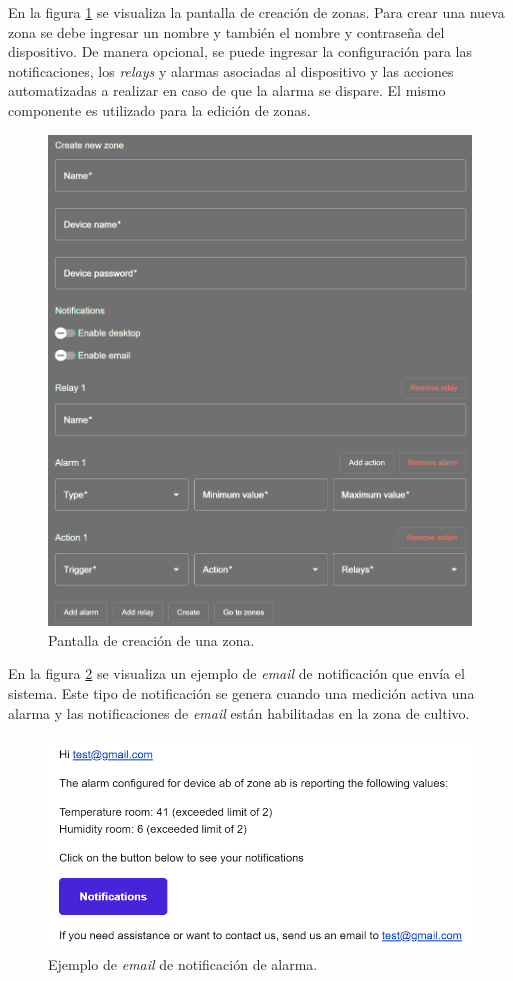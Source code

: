 En la figura \ref{fig:formularioDeZona} se visualiza la pantalla de creación de zonas. Para crear una nueva zona se debe ingresar un nombre y también el nombre y contraseña del dispositivo. De manera opcional, se puede ingresar la configuración para las notificaciones, los \textit{relays} y alarmas asociadas al dispositivo y las acciones automatizadas a realizar en caso de que la alarma se dispare. El mismo componente es utilizado para la edición de zonas. 

\begin{figure}[H]
	\centering
	\includegraphics[width=.7\textwidth]{./Figures/Frontend formulario de zona.png}
	\caption{Pantalla de creación de una zona.}
	\label{fig:formularioDeZona}
\end{figure}

En la figura \ref{fig:notificacionAlarmaEmail} se visualiza un ejemplo de \textit{email} de notificación que envía el sistema. Este tipo de notificación se genera cuando una medición activa una alarma y las notificaciones de \textit{email} están habilitadas en la zona de cultivo.

\begin{figure}[H]
	\centering
	\includegraphics[width=.8\textwidth]{./Figures/Notificacion email.png}
	\caption{Ejemplo de \textit{email} de notificación de alarma.}
	\label{fig:notificacionAlarmaEmail}
\end{figure}

